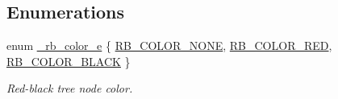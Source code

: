 \subsection*{Enumerations}
\begin{CompactItemize}
\item 
enum \hyperlink{group__dbprim__rbtree_ga52}{\_\-rb\_\-color\_\-e} \{ \hyperlink{group__dbprim__rbtree_gga52a139}{RB\_\-COLOR\_\-NONE}, 
\hyperlink{group__dbprim__rbtree_gga52a140}{RB\_\-COLOR\_\-RED}, 
\hyperlink{group__dbprim__rbtree_gga52a141}{RB\_\-COLOR\_\-BLACK}
 \}
\begin{CompactList}\small\item\em Red-black tree node color. \item\end{CompactList}\end{CompactItemize}
